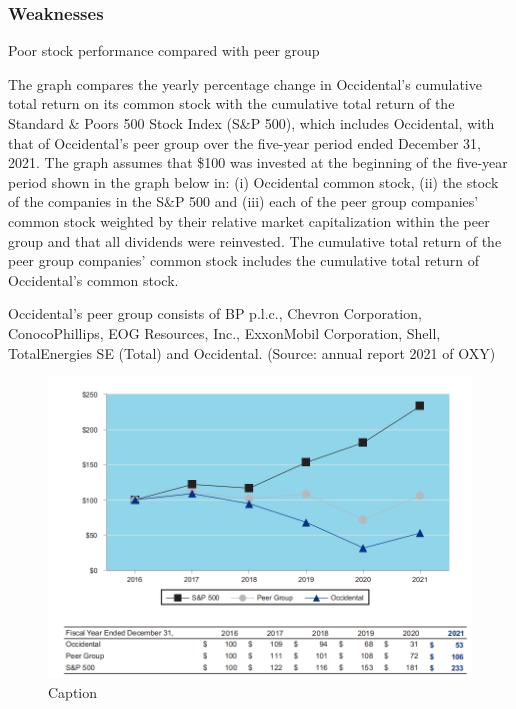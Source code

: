 \documentclass[
	a4paper, %
	12pt,%
]{CSSullivanBusinessReport}
\begin{document}
\begin{fullwidth}
\subsubsection{Weaknesses} 
Poor stock performance compared with peer group\par
The graph compares the yearly percentage change in Occidental’s cumulative total return on its common stock with the cumulative total return of the Standard \& Poors 500 Stock Index (S&P 500), which includes Occidental, with that of Occidental’s peer group over the five-year period ended December 31, 2021. The graph assumes that \$100 was invested at the beginning of the five-year period shown in the graph below in: (i) Occidental common stock, (ii) the stock of the companies in the S&P 500 and (iii) each of the peer group companies’ common stock weighted by their relative market capitalization within the peer group and that all dividends were reinvested. The cumulative total return of the peer group companies’ common stock includes the cumulative total return of Occidental’s common stock.\par
Occidental’s peer group consists of BP p.l.c., Chevron Corporation, ConocoPhillips, EOG Resources, Inc., ExxonMobil Corporation, Shell, TotalEnergies SE (Total) and Occidental.
(Source: annual report 2021 of OXY)
\begin{figure}[h]
    \centering
    \includegraphics[width=12cm]{Images/Weakness.png}
    \caption{Caption}
    \label{fig:my_label}
\end{figure}

\end{fullwidth}
\end{document}
